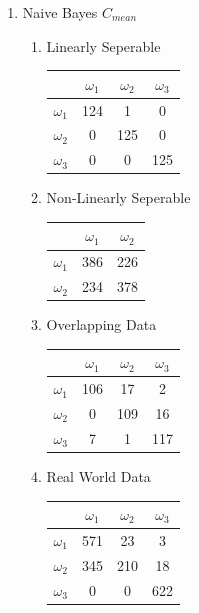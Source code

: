 \documentclass[a4paper]{article}
\begin{document}
\begin{enumerate}
\item Naive Bayes $C_{mean}$
\begin{multicols}{2}
\begin{enumerate}
\item Linearly Seperable

\begin{tabular}{ l | c | c | c | }
& $\omega_1$ & $\omega_2$ & $\omega_3$ \\
\hline
  $\omega_1$ & 124 & 1 & 0 \\ 
\hline
  $\omega_2$ & 0 & 125 & 0 \\
\hline
  $\omega_3$ & 0 & 0 & 125 \\
\hline
\end{tabular}

\item Non-Linearly Seperable

\begin{tabular}{ l | c | c |}

& $\omega_1$ & $\omega_2$ \\
\hline
  $\omega_1$ & 386 & 226 \\ 
\hline
  $\omega_2$ & 234 & 378 \\
\hline
\end{tabular}
\newline

\item Overlapping Data

\begin{tabular}{ l | c | c | c | }

& $\omega_1$ & $\omega_2$ & $\omega_3$ \\
\hline
  $\omega_1$ & 106 & 17 & 2 \\ 
\hline
  $\omega_2$ & 0 & 109 & 16 \\
\hline
  $\omega_3$ & 7 & 1 & 117 \\
\hline
\end{tabular}

\item Real World Data

\begin{tabular}{ l | c | c | c | }
& $\omega_1$ & $\omega_2$ & $\omega_3$ \\
\hline
  $\omega_1$ & 571 & 23 & 3 \\ 
\hline
  $\omega_2$ & 345 & 210 & 18 \\
\hline
  $\omega_3$ & 0 & 0 & 622 \\
\hline
\end{tabular}
\end{enumerate}
\end{multicols}


\end{enumerate}
\end{document}
